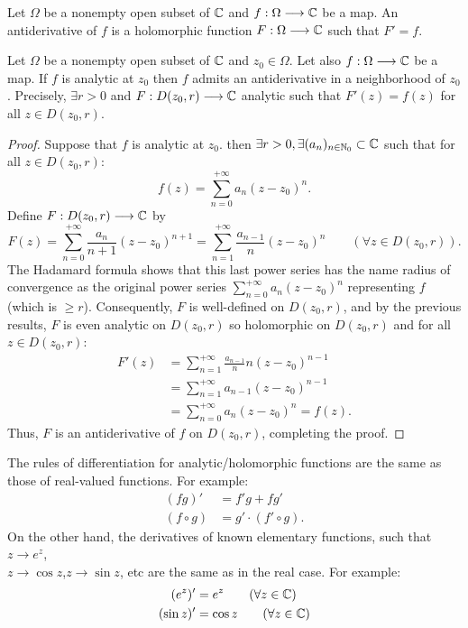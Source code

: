 \begin{definition}[]
Let $\Omega $ be a nonempty open subset of $\mathbb{C}  $ and $ f : \Omega \longrightarrow \mathbb{C}  $ 
be a map. An antiderivative of $f $ is a holomorphic function $ F : \Omega \longrightarrow \mathbb{C}  $ such that 
$F'  = f $.
\end{definition}
\begin{proposition}
  Let $\Omega $ be a nonempty open subset of $\mathbb{C}  $ and $z_0 \in  \Omega $. Let also
  $ f : \Omega \longrightarrow \mathbb{C}   $ be a map. If $f $ 
  is analytic at $z_0 $ then $f $ admits an antiderivative in a neighborhood of $z_0 $. Precisely, 
  $\exists  r > 0 $ and $ F : D(z_0, r)  \longrightarrow \mathbb{C}  $ analytic such that 
  $F'(z) = f(z)  $ for all $z \in  D(z_0, r)$. 
\end{proposition}
\begin{proof}
  Suppose that $f $ is analytic at $z_0 $. then $\exists  r > 0, \exists (a_n ) _{n \in  \mathbb{N}_0} \subset \mathbb{C} $ such that 
  for all $z \in   D(z_0, r)$: 
  \[
  f(z)  = \sum_{n=0}^{+\infty} a_n (z-z_0) ^n .
  \]
  Define $ F : D(z_0, r)  \longrightarrow \mathbb{C}  $ by 
  \[
  F(z)  = \sum_{n=0}^{+\infty} \frac{a_n }{n+1} ( z-z_0) ^{n+1} = 
  \sum_{n=1}^{+\infty } \frac{a _{n-1}}{n} (z-z_0) ^n  \quad \quad ( \forall z \in   D(z_0, r) ).
  \]
  The Hadamard formula shows that this last power series has the name radius of convergence
  as the original power series $\sum_{n=0}^{+\infty} a_n  (z-z_0) ^n  $ representing $f $ (which is $ \geq r $). 
  Consequently, $F $ is well-defined on $D(z_0, r)  $, and by the previous results, $F $ is even 
  analytic on $D(z_0, r)  $ so holomorphic on $D(z_0, r)  $ and for all $z \in  D(z_0, r)  $:
  \begin{align*}
    F'(z)  &= 
    \sum_{n=1}^{+\infty } 
    \frac{a_{n-1}}{n} n 
    (z-z_0) ^{n-1} \\
           &= 
           \sum_{n=1}^{+\infty }  
           a_{n-1}(z-z_0) ^{n-1} \\
           &= \sum_{n=0}^{+\infty} a_n (z-z_0) ^n =  f(z) .
  \end{align*}
  Thus, $F $ is an antiderivative of $f $ on $D(z_0, r)  $, completing the proof.
\end{proof}
\begin{remark}
  The rules of differentiation for analytic/holomorphic functions are the same as those of real-valued
  functions. For example:
  \begin{align*}
    (fg) ' &= f' g + f g' \\
    (f \circ  g) &= g' \cdot (f' \circ g) .
  \end{align*}
  On the other hand, the derivatives of known elementary functions, such that 
  $z \rightarrow e^{z}$,\\$ z \rightarrow \cos z$,$ z \rightarrow \sin z   $, etc are
  the same as in the real case. For example:
  \begin{align*}
    (e^{z}) ' &= e^{z}  \quad \quad (\forall  z \in  \mathbb{C} ) \\
    (\sin z) ' &= \cos z  \quad \quad (\forall  z \in   \mathbb{C} ) 
  \end{align*}
\end{remark}
